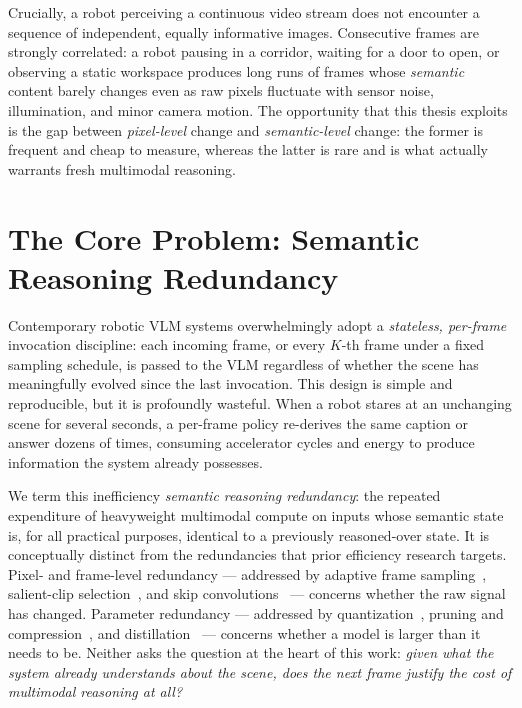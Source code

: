 Crucially, a robot perceiving a continuous video stream does not encounter a
sequence of independent, equally informative images. Consecutive frames are
strongly correlated: a robot pausing in a corridor, waiting for a door to
open, or observing a static workspace produces long runs of frames whose
\emph{semantic} content barely changes even as raw pixels fluctuate with
sensor noise, illumination, and minor camera motion. The opportunity that
this thesis exploits is the gap between \emph{pixel-level} change and
\emph{semantic-level} change: the former is frequent and cheap to measure,
whereas the latter is rare and is what actually warrants fresh multimodal
reasoning.

\section{The Core Problem: Semantic Reasoning Redundancy}
\label{sec:intro-problem}

Contemporary robotic VLM systems overwhelmingly adopt a \emph{stateless,
per-frame} invocation discipline: each incoming frame, or every $K$-th frame
under a fixed sampling schedule, is passed to the VLM regardless of whether
the scene has meaningfully evolved since the last invocation. This design is
simple and reproducible, but it is profoundly wasteful. When a robot stares
at an unchanging scene for several seconds, a per-frame policy re-derives the
same caption or answer dozens of times, consuming accelerator cycles and
energy to produce information the system already possesses.

We term this inefficiency \emph{semantic reasoning redundancy}: the repeated
expenditure of heavyweight multimodal compute on inputs whose semantic state
is, for all practical purposes, identical to a previously reasoned-over
state. It is conceptually distinct from the redundancies that prior efficiency
research targets. Pixel- and frame-level redundancy --- addressed by adaptive
frame sampling~\cite{Wu2019AdaFrame}, salient-clip
selection~\cite{Korbar2019SCSampler}, and skip
convolutions~\cite{Habibian2021Skip} --- concerns whether the raw signal has
changed. Parameter redundancy --- addressed by
quantization~\cite{Dettmers2022LLMint8}, pruning and
compression~\cite{Han2016DeepCompression}, and
distillation~\cite{Hinton2015Distillation} --- concerns whether a model is
larger than it needs to be. Neither asks the question at the heart of this
work: \emph{given what the system already understands about the scene, does
the next frame justify the cost of multimodal reasoning at all?}

